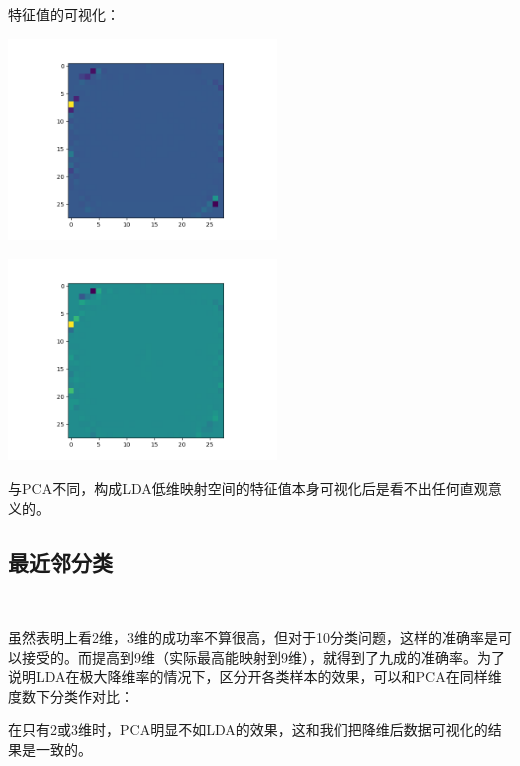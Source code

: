 \documentclass[hyperref,UTF8]{ctexart}
\begin{document}
\par 特征值的可视化：\\
\centerline{\includegraphics[height=2.1in]{exp-results/ldaeig0.png}}
\centerline{\includegraphics[height=2.1in]{exp-results/ldaeig1.png}}
\par 与PCA不同，构成LDA低维映射空间的特征值本身可视化后是看不出任何直观意义的。
\subsection*{最近邻分类}\
\begin{table}[!htbp]
  \centering
\caption{LDA不同维度下NN分类准确率}
\label{tb:lda_knn}
\end{table}
\par 虽然表明上看2维，3维的成功率不算很高，但对于10分类问题，这样的准确率是可以接受的。而提高到9维（实际最高能映射到9维），就得到了九成的准确率。为了说明LDA在极大降维率的情况下，区分开各类样本的效果，可以和PCA在同样维度数下分类作对比：\\
\begin{table}[!htbp]
  \centering
\caption{PCA同样维度下准确率}
\label{tb:lda_knn}
\end{table}
\par 在只有2或3维时，PCA明显不如LDA的效果，这和我们把降维后数据可视化的结果是一致的。
\end{document}
